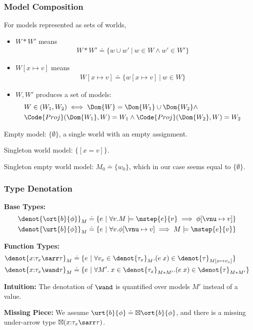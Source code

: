 \begin{frame}[fragile]
    \frametitle{Model Composition}

For models represented as sets of worlds,
\begin{itemize}
    \item $W * W'$ means
    \begin{align*}
        W * W' \doteq \{ w \cup w' ~|~ w \in W \land w' \in W'\}
    \end{align*}
    \item $W[x\mapsto v]$ means
    \begin{align*}
        W[x\mapsto v] \doteq \{ w[x\mapsto v] ~|~ w \in W \}
    \end{align*}
    \item $W , W'$ produces a set of models:
    \begin{align*}
        &W \in (W_1 , W_2) \iff \Dom{W} = \Dom{W_1} \cup \Dom{W_2} \land
        \\&\Code{Proj}(\Dom{W_1}, W) = W_1 \land \Code{Proj}(\Dom{W_2}, W) = W_2 
    \end{align*}
\end{itemize}

Empty model: $\{\emptyset\}$, a single world with an empty assignment.

Singleton world model: $\{[x = v]\}$.

Singleton empty world model: $M_0 \doteq \{ w_0 \}$, which in our case seems equal to $\{\emptyset\}$. 

\end{frame}

\begin{frame}[fragile]
    \frametitle{Type Denotation}

\textbf{Base Types:}
\begin{align*}
    \denot{\ort{b}{\phi}}_M &\doteq \{ e ~|~ \forall v. M \models \mstep{e}{v} \implies \phi[\vnu \mapsto v] \} \\
    \denot{\urt{b}{\phi}}_M &\doteq \{ e ~|~ \forall v. \phi[\vnu \mapsto v] \implies M \models \mstep{e}{v} \}
\end{align*}

\textbf{Function Types:}
\begin{align*}
    \denot{x{:}\tau_x \sarr \tau}_M &\doteq \{ e ~|~ \forall v_x \in \denot{\tau_x}_M. (e\;x) \in \denot{\tau}_{M[x\mapsto v_x]} \} \\
    \denot{x{:}\tau_x \wand \tau}_M &\doteq \{ e ~|~ \forall M'.\; x\in\denot{\tau_x}_{M*M'}. (e\;x) \in \denot{\tau}_{M * M'} \}
\end{align*}

\textbf{Intuition:} The denotation of $\wand$ is quantified over models $M'$ instead of a value.

\textbf{Missing Piece:} We assume $\urt{b}{\phi} \doteq \boxtimes \ort{b}{\phi}$, and there is a missing under-arrow type $\boxtimes(x{:}\tau_x \sarr \tau)$.

\end{frame}

